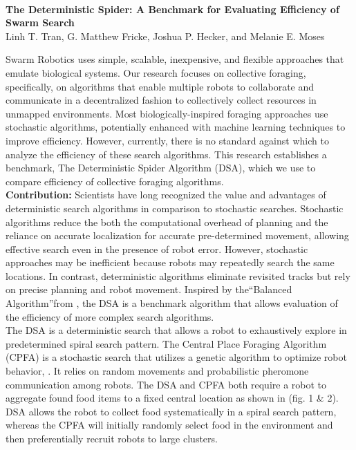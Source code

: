 \documentclass[10pt]{article}
\begin{document}
\begingroup  
  \centering
  \large \textbf{\\
  \vspace{0.1em}
  The Deterministic Spider: A Benchmark for Evaluating Efficiency of Swarm Search}\\[0.5em]
  \small Linh T. Tran, G. Matthew Fricke, Joshua P. Hecker, and Melanie E. Moses\par
  \thispagestyle{empty}
\endgroup


Swarm Robotics uses simple, scalable, inexpensive, and flexible approaches that emulate biological systems. Our research focuses on collective foraging, specifically, on algorithms that enable multiple robots to collaborate and communicate in a decentralized fashion to collectively collect resources in unmapped environments. Most biologically-inspired foraging approaches use stochastic algorithms, potentially enhanced with machine learning techniques to improve efficiency. However, currently, there is no standard against which to analyze the efficiency of these search algorithms. This research establishes a benchmark, The Deterministic Spider Algorithm (DSA), which we use to compare efficiency of collective foraging algorithms.\\
{\textbf{Contribution: }}Scientists have long recognized the value and advantages of deterministic search algorithms in comparison to stochastic searches. Stochastic algorithms reduce the both the computational overhead of planning and the reliance on accurate localization for accurate pre-determined movement, allowing effective search even in the presence of robot error. However, stochastic approaches may be inefficient because robots may repeatedly search the same locations. In contrast, deterministic algorithms eliminate revisited tracks but rely on precise planning and robot movement. Inspired by the\textquotedblleft Balanced Algorithm\textquotedblright from \citep*{Baeza-Yates91searchingin}, the DSA is a benchmark algorithm that allows evaluation of the efficiency of more complex search algorithms. \\
The DSA is a deterministic search that allows a robot to exhaustively explore in predetermined spiral search pattern. The Central Place Foraging Algorithm (CPFA) is a stochastic search that utilizes a genetic algorithm to optimize robot behavior, \citep*{Hecker&Moses15Beyond}. It relies on random movements and probabilistic pheromone communication among robots. The DSA and CPFA both require a robot to aggregate found food items to a fixed central location as shown in (fig. 1 \& 2). DSA allows the robot to collect food systematically in a spiral search pattern, whereas the CPFA will initially randomly select food in the environment and then preferentially recruit robots to large clusters.
\end{document}
